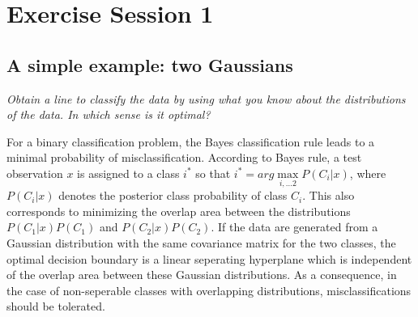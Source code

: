 \documentclass{article}
\begin{document}
%
%
%   
%        
%	
%        
%                
%        
%



\section{Exercise Session 1}

\subsection{A simple example: two Gaussians}


\textit{Obtain a line to classify the data by using what you know about the distributions of
the data. In which sense is it optimal?}

For a binary classification problem, the Bayes classification rule leads to a minimal probability of misclassification. According to Bayes rule, a test observation $x$ is assigned to a class $i^*$ so that $i^* = arg \max\limits_{i,\dots 2} P(C_i|x)$, where $P(C_i|x)$ denotes the posterior class probability of class $C_i$. This also corresponds to minimizing the overlap area between the distributions $P(C_1|x)P(C_1)$ and $P(C_2|x)P(C_2)$. If the data are generated from a Gaussian distribution with the same covariance matrix for the two classes, the optimal decision boundary is a linear seperating hyperplane which is independent of the overlap area between these Gaussian distributions. As a consequence, in the case of non-seperable classes with overlapping distributions, misclassifications should be tolerated.
\end{document}
